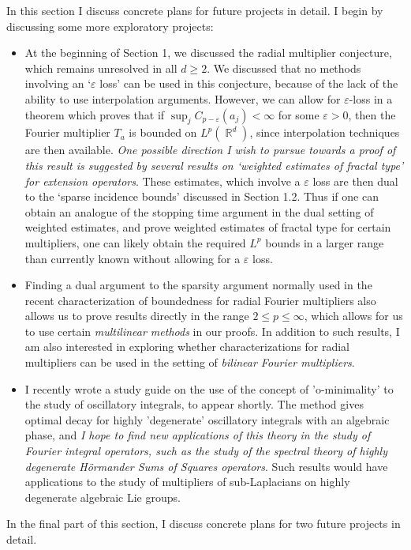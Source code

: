 \documentclass[11pt]{article}
\DeclareMathOperator{\RR}{\mathbb{R}}
\begin{document}
In this section I discuss concrete plans for future projects in detail. I begin by discussing some more exploratory projects:
%
\begin{itemize}
	\item At the beginning of Section 1, we discussed the radial multiplier conjecture, which remains unresolved in all $d \geq 2$. We discussed that no methods involving an `$\varepsilon$ loss' can be used in this conjecture, because of the lack of the ability to use interpolation arguments. However, we can allow for $\varepsilon$-loss in a theorem which proves that if $\sup_j C_{p - \varepsilon}(a_j) < \infty$ for some $\varepsilon > 0$, then the Fourier multiplier $T_a$ is bounded on $L^p(\RR^d)$, since interpolation techniques are then available. \emph{One possible direction I wish to pursue towards a proof of this result is suggested by several results on `weighted estimates of fractal type' for extension operators}. These estimates, which involve a $\varepsilon$ loss are then dual to the `sparse incidence bounds' discussed in Section 1.2. Thus if one can obtain an analogue of the stopping time argument in the dual setting of weighted estimates, and prove weighted estimates of fractal type for certain multipliers, one can likely obtain the required $L^p$ bounds in a larger range than currently known without allowing for a $\varepsilon$ loss.

	\item Finding a dual argument to the sparsity argument normally used in the recent characterization of boundedness for radial Fourier multipliers also allows us to prove results directly in the range $2 \leq p \leq \infty$, which allows for us to use certain \emph{multilinear methods} in our proofs. In addition to such results, I am also interested in exploring whether characterizations for radial multipliers can be used in the setting of \emph{bilinear Fourier multipliers}.


	\item I recently wrote a study guide on the use of the concept of 'o-minimality' to the study of oscillatory integrals, to appear shortly. The method gives optimal decay for highly 'degenerate' oscillatory integrals with an algebraic phase, and \emph{I hope to find new applications of this theory in the study of Fourier integral operators, such as the study of the spectral theory of highly degenerate H\"{o}rmander Sums of Squares operators}. Such results would have applications to the study of multipliers of sub-Laplacians on highly degenerate algebraic Lie groups.
\end{itemize}
%
In the final part of this section, I discuss concrete plans for two future projects in detail.
\end{document}
